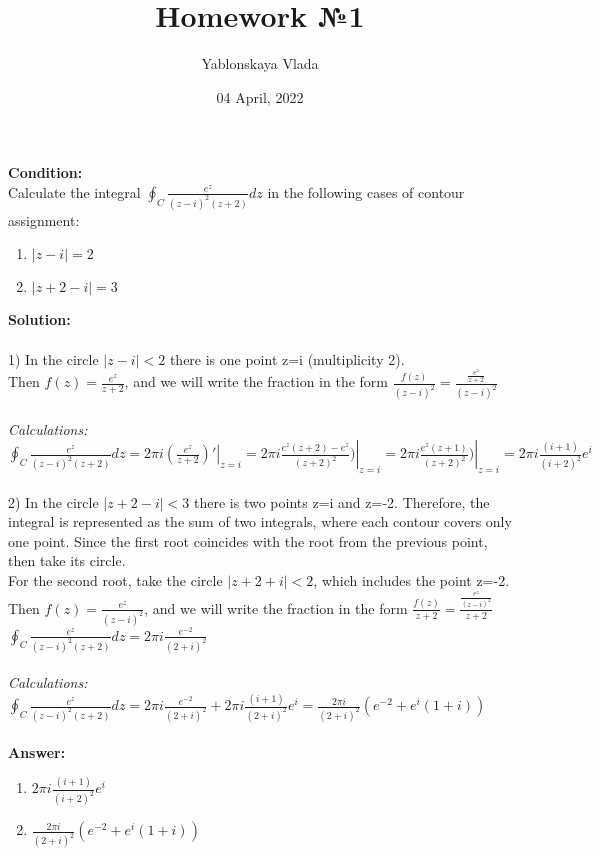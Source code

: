 \documentclass{article}
\title{Homework №1}%
\author{Yablonskaya Vlada}%
\date{ 04 April, 2022}%
\begin{document}
\maketitle%
\textbf{Condition:} 
\\Calculate the integral \( \oint_C \frac{e^z}{(z-i)^2(z+2)}{dz} \) in the following cases of contour assignment:
\begin{enumerate}
  \item  \(|z-i|=2\)
  \item  \(|z+2-i|=3\)
\end{enumerate}

\textbf{Solution:} 
\\
\\ 1) In the circle $|z-i|<2$ there is one point z=i  (multiplicity 2).
\\ Then $f(z)=\frac{e^z}{z+2}$, and we will write the fraction in the form $\frac{f(z)}{(z-i)^2}=\frac{\frac{e^z}{z+2}}{(z-i)^2}$
\\ 
\\ \textit{Calculations:} 
\\ \( \oint_C \frac{e^z}{(z-i)^2(z+2)}{dz} = \left. 2\pi i (\frac{e^z}{z+2})'\right|_{z=i} = \left. 2\pi i \frac{e^z(z+2)-e^z}{(z+2)^2})\right|_{z=i}= \left. 2\pi i \frac{e^z(z+1)}{(z+2)^2})\right|_{z=i} =  2\pi i \frac{(i+1)}{(i+2)^2}{e^i}\)
\\
\\ 2)  In the circle $|z+2-i|<3$ there is two points z=i and z=-2. Therefore, the integral is represented as the sum of two integrals, where each contour covers only one point. Since the first root coincides with the root from the previous point, then take its circle.
\\ For the second root, take the circle $|z+2+i|<2$, which includes the point z=-2.
\\Then $f(z)=\frac{e^z}{(z-i)^2}$, and we will write the fraction in the form $\frac{f(z)}{z+2}=\frac{\frac{e^z}{(z-i)^2}}{z+2}$
\\ \( \oint_C \frac{e^z}{(z-i)^2(z+2)}{dz}=  2\pi i \frac{e^{-2}}{(2+i)^2}\)
\\
\\ \textit{Calculations:} 
\\  \( \oint_C \frac{e^z}{(z-i)^2(z+2)}{dz}=  2\pi i \frac{e^{-2}}{(2+i)^2}+ 2\pi i \frac{(i+1)}{(2+i)^2}{e^i}=\frac{2\pi i}{(2+i)^2}{(e^{-2}+e^i(1+i))}\)
\\
\\\textbf{Answer:}
\begin{enumerate}
  \item  \(2\pi i \frac{(i+1)}{(i+2)^2}{e^i}\)
  \item  \(\frac{2\pi i}{(2+i)^2}{(e^{-2}+e^i(1+i))}\)
\end{enumerate}
\end{document}
